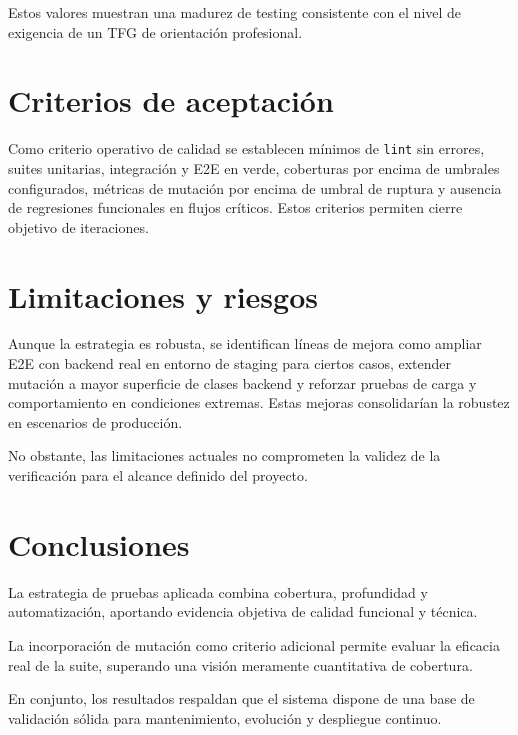 Estos valores muestran una madurez de testing consistente con el nivel de exigencia
de un TFG de orientaci\'on profesional.

\FloatBarrier
\section{Criterios de aceptaci\'on}

Como criterio operativo de calidad se establecen m\'inimos de \texttt{lint} sin errores, suites unitarias, integraci\'on y E2E en verde, coberturas por encima de umbrales configurados, m\'etricas de mutaci\'on por encima de umbral de ruptura y ausencia de regresiones funcionales en flujos cr\'iticos. Estos criterios permiten cierre objetivo de iteraciones.

\FloatBarrier
\section{Limitaciones y riesgos}

Aunque la estrategia es robusta, se identifican l\'ineas de mejora como ampliar E2E con backend real en entorno de staging para ciertos casos, extender mutaci\'on a mayor superficie de clases backend y reforzar pruebas de carga y comportamiento en condiciones extremas. Estas mejoras consolidar\'ian la robustez en escenarios de producci\'on.

No obstante, las limitaciones actuales no comprometen la validez de la verificaci\'on
para el alcance definido del proyecto.

\FloatBarrier
\section{Conclusiones}

La estrategia de pruebas aplicada combina cobertura, profundidad y automatizaci\'on,
aportando evidencia objetiva de calidad funcional y t\'ecnica.

La incorporaci\'on de mutaci\'on como criterio adicional permite evaluar
la eficacia real de la suite, superando una visi\'on meramente cuantitativa
de cobertura.

En conjunto, los resultados respaldan que el sistema dispone de una base
de validaci\'on s\'olida para mantenimiento, evoluci\'on y despliegue continuo.






